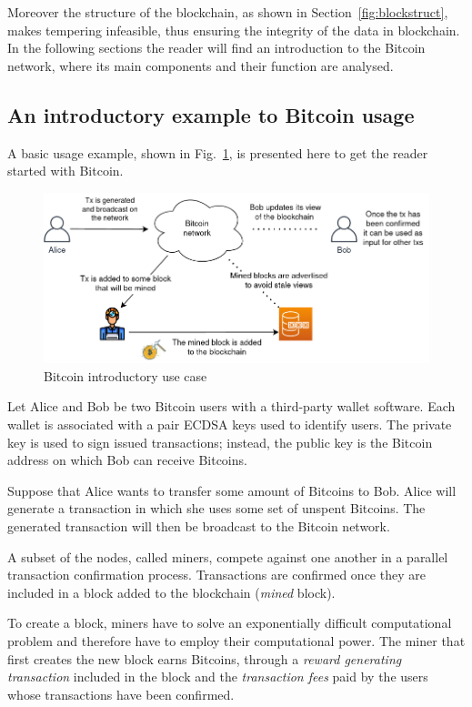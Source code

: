 \documentclass[12pt, letterpaper, twoside]{article}
\begin{document}
Moreover the structure of the blockchain, as shown in Section~\ref{fig:blockstruct}, makes tempering infeasible, thus ensuring the integrity of the data in blockchain.\\

In the following sections the reader will find an introduction to the Bitcoin network, where its main components and their function are analysed.


\subsection{An introductory example to Bitcoin usage}\label{sec:useexample}
A basic usage example, shown in Fig.~\ref{fig:basicexample}, is presented here to get the reader started with Bitcoin.

\begin{figure}[h!]
	\includegraphics[width=.90\textwidth]{pict/basicexample.png}
	\centering
	\caption{Bitcoin introductory use case}
	\label{fig:basicexample}
\end{figure}

Let Alice and Bob be two Bitcoin users with a third-party wallet software. Each wallet is associated with a pair ECDSA keys used to identify users. The private key is used to sign issued transactions; instead, the public key is the Bitcoin address on which Bob can receive Bitcoins.

Suppose that Alice wants to transfer some amount of Bitcoins to Bob. Alice will generate a transaction in which she uses some set of unspent Bitcoins. The generated transaction will then be broadcast to the Bitcoin network.

A subset of the nodes, called miners, compete against one another in a parallel transaction confirmation process. Transactions are confirmed once they are included in a block added to the blockchain (\emph{mined} block).

To create a block, miners have to solve an exponentially difficult computational problem and therefore have to employ their computational power. The miner that first creates the new block earns Bitcoins, through a \emph{reward generating transaction} included in the block and the \emph{transaction fees} paid by the users whose transactions have been confirmed.
\end{document}
